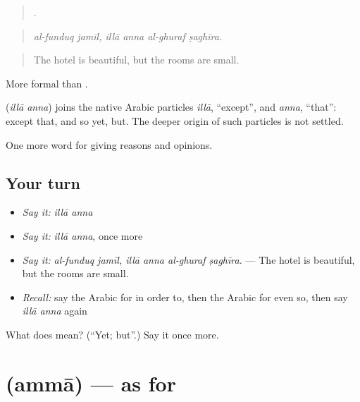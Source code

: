 \begin{quote}
     .
\end{quote}

\begin{quote}
\emph{al-funduq jamīl, illā anna al-ghuraf ṣaghīra.}
\end{quote}

\begin{quote}
The hotel is beautiful, but the rooms are small.
\end{quote}

More formal than .

\begin{cousinweb}
\textbf{ } (\emph{illā anna}) joins the native Arabic particles \emph{illā}, \textquotedblleft{}except\textquotedblright{}, and \emph{anna}, \textquotedblleft{}that\textquotedblright{}: except that, and so yet, but. The deeper origin of such particles is not settled.
\end{cousinweb}

\begin{grammarlens}[title={What you've built}]
One more word for giving reasons and opinions.
\end{grammarlens}

\subsection*{Your turn}
\begin{itemize}
\raggedright
  \item \emph{Say it:} \emph{illā anna}
  \item \emph{Say it:} \emph{illā anna}, once more
  \item \emph{Say it:} \emph{al-funduq jamīl, illā anna al-ghuraf ṣaghīra.} — The hotel is beautiful, but the rooms are small.
  \item \emph{Recall:} say the Arabic for in order to, then the Arabic for even so, then say \emph{illā anna} again
\end{itemize}

\begin{tcolorbox}[breakable,colback=teal!4,colframe=teal!35!black,title={Before you move on}]
What does   mean? (\textquotedblleft{}Yet; but\textquotedblright{}.) Say it once more.
\end{tcolorbox}
\section[\texorpdfstring{\ar{أما} (ammā)}{أما (ammā)}]{ (ammā) — as for}

